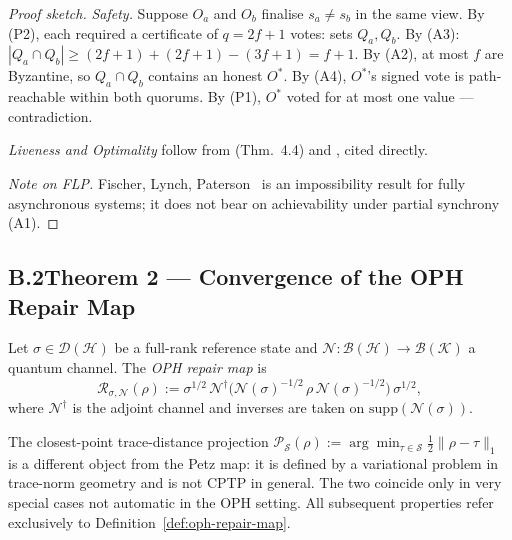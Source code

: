 \begin{proof}[Proof sketch]
\textit{Safety.}
Suppose $O_a$ and $O_b$ finalise $s_a\neq s_b$ in the same view.
By (P2), each required a certificate of $q=2f+1$ votes: sets $Q_a,Q_b$.
By (A3): $|Q_a\cap Q_b|\geq(2f+1)+(2f+1)-(3f+1)=f+1$.
By (A2), at most $f$ are Byzantine, so $Q_a\cap Q_b$ contains an
honest $O^*$.
By (A4), $O^*$'s signed vote is path-reachable within both quorums.
By (P1), $O^*$ voted for at most one value --- contradiction.

\textit{Liveness and Optimality}
follow from \cite{DLS88} (Thm.~4.4) and \cite{Lamport1982}, cited directly.

\textit{Note on FLP.}
Fischer, Lynch, Paterson~\cite{FLP85} is an impossibility result for
fully asynchronous systems; it does not bear on achievability under
partial synchrony (A1).
\end{proof}

\subsection*{B.2\quad Theorem 2 --- Convergence of the OPH Repair Map}

\begin{definition}
\label{def:oph-repair-map}
Let $\sigma\in\mathcal{D}(\mathcal{H})$ be a full-rank reference state and
$\mathcal{N}:\mathcal{B}(\mathcal{H})\to\mathcal{B}(\mathcal{K})$ a quantum channel.
The \emph{OPH repair map} is
\[
  \mathcal{R}_{\sigma,\mathcal{N}}(\rho)
  := \sigma^{1/2}\,
     \mathcal{N}^\dagger\!\bigl(
       \mathcal{N}(\sigma)^{-1/2}\,\rho\,\mathcal{N}(\sigma)^{-1/2}
     \bigr)
     \,\sigma^{1/2},
\]
where $\mathcal{N}^\dagger$ is the adjoint channel and inverses are
taken on $\mathrm{supp}(\mathcal{N}(\sigma))$.
\end{definition}

\begin{remark}
The closest-point trace-distance projection
$\mathcal{P}_{\mathcal{S}}(\rho):=\arg\min_{\tau\in\mathcal{S}}\tfrac12\|\rho-\tau\|_1$
is a different object from the Petz map: it is defined by a variational
problem in trace-norm geometry and is not \textrm{CPTP} in general.
The two coincide only in very special cases not automatic in the
\textrm{OPH} setting.
All subsequent properties refer exclusively to
Definition~\ref{def:oph-repair-map}.
\end{remark}


